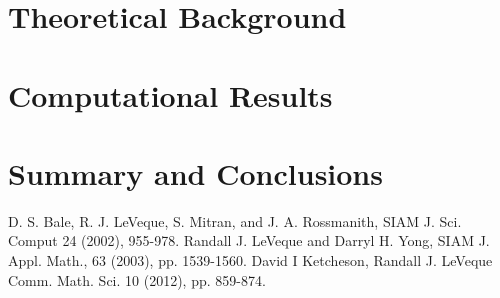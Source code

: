\documentclass{article}
\begin{document}
\section{Theoretical Background}


\section{Computational Results}


\section{Summary and Conclusions}




\begin{thebibliography}{9}
D. S. Bale, R. J. LeVeque, S. Mitran, and J. A. Rossmanith, SIAM J. Sci. Comput 24 (2002), 955-978.
Randall J. LeVeque and Darryl H. Yong, SIAM J. Appl. Math., 63 (2003), pp. 1539-1560.
David I Ketcheson, Randall J. LeVeque Comm. Math. Sci. 10 (2012), pp. 859-874.
\end{thebibliography}
\end{document}
